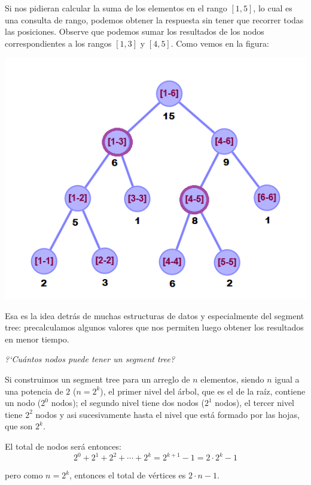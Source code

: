 Si nos pidieran calcular la suma de los elementos en el rango $[1, 5]$, lo cual es una consulta de rango, podemos obtener la res\-pues\-ta sin tener que recorrer todas las posiciones. Observe que podemos sumar los resultados de los nodos correspondientes a los rangos $[1, 3]$ y $[4, 5]$. Como vemos en la figura:

\begin{minipage}{\columnwidth}
    \includegraphics[width=\linewidth]{imag/segment_tree_query.png}
    \label{example_query}
\end{minipage}

Esa es la idea detr\'as de muchas estructuras de datos y especialmente del segment tree: precalculamos algunos valores que nos permiten luego obtener los resultados en menor tiempo. 

\hfill \break
\textit{?`Cu\'antos nodos puede tener un segment tree?}

Si construimos un segment tree para un arreglo de $n$ elementos, siendo $n$ igual a una potencia de $2$ ($n = 2^k$), el primer nivel del \'arbol, que es el de la ra\'iz, contiene un nodo ($2^0$ nodos); el segundo nivel tiene dos nodos ($2^1$ nodos), el tercer nivel tiene $2^2$ nodos y asi sucesivamente hasta el nivel que est\'a formado por las hojas, que son $2^k$.

El total de nodos ser\'a entonces:
$$ 2^0 + 2^1 + 2^2 + \cdots + 2^k = 2^{k+1} - 1 = 2 \cdot 2^k - 1$$

pero como $n = 2^k$, entonces el total de v\'ertices es $2 \cdot n-1$.

